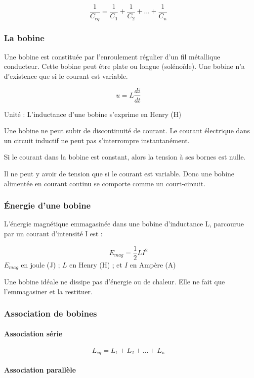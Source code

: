 \documentclass[a4paper,10pt]{article}
\begin{document}
$$\frac{1}{C_{eq}}=\frac{1}{C_1}+\frac{1}{C_2}+...+\frac{1}{C_n}$$

\subsubsection{La bobine}

Une bobine est constituée par l’enroulement régulier d’un fil métallique
conducteur. Cette bobine peut être plate ou longue (solénoïde). Une bobine
n’a d’existence que si le courant est variable.

$$u=L\frac{di}{dt}$$

Unité : L’inductance d’une bobine s’exprime en Henry (H)

Une bobine ne peut subir de discontinuité de courant. Le
courant électrique dans un circuit inductif ne peut pas
s’interrompre instantanément.


Si le courant dans la bobine est constant, alors la tension à ses
bornes est nulle.

Il ne peut y avoir de tension que si le courant est variable.
Donc une bobine alimentée en courant continu se comporte
comme un court-circuit.

\subsubsection{Énergie d'une bobine}
L’énergie magnétique emmagasinée dans une bobine
d’inductance L, parcourue par un courant d’intensité I est :

$$E_{mag}=\frac{1}{2}LI^2$$ $E_{mag}$ en joule (J) ; $L$ en Henry (H) ; et $I$ en Ampère (A)

Une bobine idéale ne dissipe pas d’énergie ou de chaleur.
Elle ne fait que l’emmagasiner et la restituer.

\subsubsection{Association de bobines}

\paragraph{Association série}

$$L_{eq}=L_1+L_2+...+L_n$$


\paragraph{Association parallèle}
\end{document}
